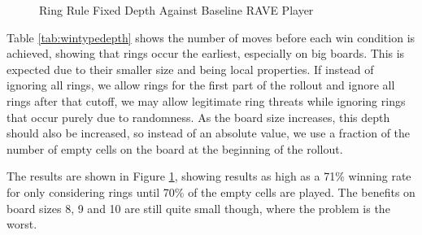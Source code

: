 \begin{figure}
	\centering
{}
	\caption{Ring Rule Fixed Depth Against Baseline RAVE Player}
	\label{fig:ringdepth}
\end{figure}

Table \ref{tab:wintypedepth} shows the number of moves before each win condition is achieved, showing that rings occur the earliest, especially on big boards. This is expected due to their smaller size and being local properties. If instead of ignoring all rings, we allow rings for the first part of the rollout and ignore all rings after that cutoff, we may allow legitimate ring threats while ignoring rings that occur purely due to randomness. As the board size increases, this depth should also be increased, so instead of an absolute value, we use a fraction of the number of empty cells on the board at the beginning of the rollout.

The results are shown in Figure \ref{fig:ringdepth}, showing results as high as a 71\% winning rate for only considering rings until 70\% of the empty cells are played. The benefits on board sizes 8, 9 and 10 are still quite small though, where the problem is the worst.


